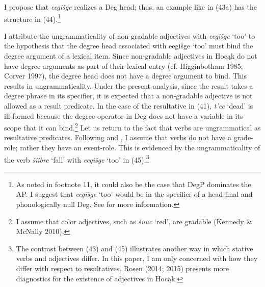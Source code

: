 \documentclass[output=paper]{LSP/langsci}
\begin{document}
\begin{exe}
\ex
\begin{xlist}




\end{xlist}
\end{exe}

I propose that \textit{eegišge} realizes a Deg head; thus, an example like in (43a) has the structure in (44).\footnote{As noted in footnote 11, it could also be the case that DegP dominates the AP. I suggest that \textit{eegišge} `too' would be in the specifier of a head-final and phonologically null Deg. See \citet{Rosen2015} for more information.}

\begin{exe}
\ex 
{\hspace{1em}}\newline
{}
\end{exe}

I attribute the ungrammaticality of non-gradable adjectives with \textit{eegišge} `too' to the hypothesis that the degree head associated with eegišge `too' must bind the degree argument of a lexical item. Since non-gradable adjectives in Hocąk do not have degree arguments as part of their lexical entry (cf. Higginbotham 1985; Corver 1997), the degree head does not have a degree argument to bind. This results in ungrammaticality. Under the present analysis, since the result takes a degree phrase in its specifier, it is expected that a non-gradable adjective is not allowed as a result predicate. In the case of the resultative in (41), \textit{t'ee} `dead' is ill-formed because the degree operator in Deg does not have a variable in its scope that it can bind.\footnote{I assume that color adjectives, such as \textit{šuuc} `red', are gradable (Kennedy \& McNally 2010).} Let us return to the fact that verbs are ungrammatical as resultative predicates. Following \citet{Higginbotham1985} and \citet{Corver1997}, I assume that verbs do not have a grade-role; rather they have an event-role. This is evidenced by the ungrammaticality of the verb \textit{šiibre} `fall' with \textit{eegišge} `too' in (45).\footnote{The contrast between (43) and (45) illustrates another way in which stative verbs and adjectives differ. In this paper, I am only concerned with how they differ with respect to resultatives. Rosen (2014; 2015) presents more diagnostics for the existence of adjectives in Hocąk.}
\end{document}
